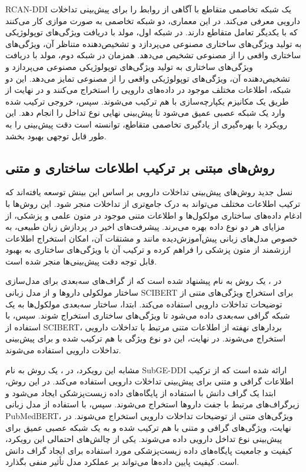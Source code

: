 RCAN-DDI \cite{ref_zhang2024} یک شبکه تخاصمی متقاطع با آگاهی از روابط را برای پیش‌بینی تداخلات دارویی معرفی می‌کند. در این معماری، دو شبکه تخاصمی به صورت موازی کار می‌کنند که با یکدیگر تعامل متقاطع دارند. در شبکه اول، مولد با دریافت ویژگی‌های توپولوژیکی به تولید ویژگی‌های ساختاری مصنوعی می‌پردازد و تشخیص‌دهنده متناظر آن، ویژگی‌های ساختاری واقعی را از مصنوعی تشخیص می‌دهد. همزمان در شبکه دوم، مولد با دریافت ویژگی‌های ساختاری به تولید ویژگی‌های توپولوژیکی مصنوعی می‌پردازد و تشخیص‌دهنده آن، ویژگی‌های توپولوژیکی واقعی را از مصنوعی تمایز می‌دهد. این دو شبکه، اطلاعات مختلف موجود در داده‌های دارویی را استخراج می‌کنند و در نهایت از طریق یک مکانیزم یکپارچه‌سازی با هم ترکیب می‌شوند. سپس، خروجی ترکیب شده وارد یک شبکه عصبی عمیق می‌شود تا پیش‌بینی نهایی نوع تداخل را انجام دهد. این رویکرد با بهره‌گیری از یادگیری تخاصمی متقاطع، توانسته است دقت پیش‌بینی را به طور قابل توجهی بهبود بخشد.

\subsection{روش‌های مبتنی بر ترکیب اطلاعات ساختاری و متنی}

نسل جدید روش‌های پیش‌بینی تداخلات دارویی بر اساس این بینش توسعه یافته‌اند که ترکیب اطلاعات مختلف می‌تواند به درک جامع‌تری از تداخلات منجر شود. این روش‌ها با ادغام داده‌های ساختاری مولکول‌ها و اطلاعات متنی موجود در متون علمی و پزشکی، از مزایای هر دو نوع داده بهره می‌برند. پیشرفت‌های اخیر در پردازش زبان طبیعی، به خصوص مدل‌های زبانی پیش‌آموزش‌دیده مانند  و مشتقات آن، امکان استخراج اطلاعات ارزشمند از متون پزشکی را فراهم کرده و ترکیب آن با ویژگی‌های ساختاری به بهبود قابل توجه دقت پیش‌بینی‌ها منجر شده است.

در \cite{ref_he2023}، یک روش به نام  پیشنهاد شده است که از گراف‌های سه‌بعدی برای مدل‌سازی ساختار مولکولی داروها و از مدل زبانی SCIBERT برای استخراج ویژگی‌های متنی از توضیحات تداخلات دارویی استفاده می‌کند. ابتدا، ساختار سه‌بعدی مولکول‌ها به یک شبکه گرافی سه‌بعدی داده می‌شود تا ویژگی‌های ساختاری استخراج شوند. سپس، با استفاده از SCIBERT، بردارهای نهفته از اطلاعات متنی مرتبط با تداخلات دارویی استخراج می‌شوند. در نهایت، این دو نوع ویژگی با هم ترکیب شده و برای پیش‌بینی تداخلات دارویی استفاده می‌شوند.

مشابه این رویکرد، در \cite{ref_shi2024}، یک روش به نام SubGE-DDI ارائه شده است که از ترکیب اطلاعات گرافی و متنی برای پیش‌بینی تداخلات دارویی استفاده می‌کند. در این روش، ابتدا یک گراف دانش با استفاده از پایگاه‌های داده زیست‌پزشکی ایجاد می‌شود و زیرگراف‌های مرتبط با جفت داروها استخراج می‌شوند. سپس، با استفاده از مدل زبانی PubMedBERT، ویژگی‌های متنی از توضیحات تداخلات دارویی استخراج می‌شوند. در نهایت، ویژگی‌های گرافی و متنی با هم ترکیب شده و به یک شبکه عصبی عمیق برای پیش‌بینی نوع تداخل دارویی داده می‌شوند. یکی از چالش‌های احتمالی این رویکرد، کیفیت و جامعیت پایگاه‌های داده زیست‌پزشکی مورد استفاده برای ایجاد گراف دانش است. کیفیت پایین داده‌ها می‌تواند بر عملکرد مدل تأثیر منفی بگذارد.


